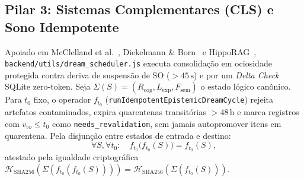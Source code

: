 \documentclass[10pt,twocolumn]{article}
\begin{document}
\subsection{Pilar 3: Sistemas Complementares (CLS) e Sono Idempotente}
Apoiado em McClelland et al.~\cite{E09}, Diekelmann \& Born~\cite{E10} e HippoRAG~\cite{E11}, \texttt{backend/utils/dream\_scheduler.js} executa consolida\c{c}\~ao em ociosidade protegida contra deriva de suspens\~ao de SO ($>45\,\mathrm{s}$) e por um \emph{Delta Check} SQLite zero-token. Seja $\Sigma(S) = (R_{\mathrm{cog}}, L_{\mathrm{exp}}, F_{\mathrm{sem}})$ o estado l\'ogico can\^onico. Para $t_0$ fixo, o operador $f_{t_0}$ (\texttt{runIdempotentEpistemicDreamCycle}) rejeita artefatos contaminados, expira quarentenas transit\'orias $>48\,\mathrm{h}$ e marca registros com $v_{\mathrm{to}} \le t_0$ como \texttt{needs\_revalidation}, sem jamais autopromover itens em quarentena. Pela disjun\c{c}\~ao entre estados de entrada e destino:
\begin{equation}
\forall S, \forall t_0: \quad f_{t_0}\bigl(f_{t_0}(S)\bigr) = f_{t_0}(S),
\end{equation}
atestado pela igualdade criptogr\'afica $\mathcal{H}_{\mathrm{SHA256}}(\Sigma(f_{t_0}(f_{t_0}(S)))) = \mathcal{H}_{\mathrm{SHA256}}(\Sigma(f_{t_0}(S)))$.
\end{document}
